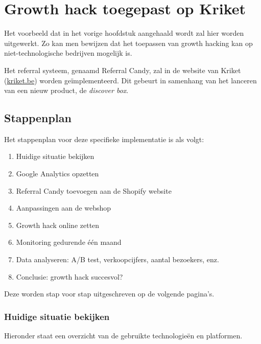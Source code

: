 
\chapter{Growth hack toegepast op Kriket}
\label{ch:implementatie}

Het voorbeeld dat in het vorige hoofdstuk aangehaald wordt zal hier worden uitgewerkt. Zo kan men bewijzen dat het toepassen van growth hacking kan op niet-technologische bedrijven mogelijk is. 

Het referral systeem, genaamd Referral Candy, zal in de website van Kriket (\href{https://kriket.be}{kriket.be}) worden geïmplementeerd. Dit gebeurt in samenhang van het lanceren van een nieuw product, de \emph{discover box}.

\section{Stappenplan}
\label{sec:implementatie-stappenplan}

Het stappenplan voor deze specifieke implementatie is als volgt:

\begin{enumerate}
	\item Huidige situatie bekijken
	\item Google Analytics opzetten
	\item Referral Candy toevoegen aan de Shopify website
	\item Aanpassingen aan de webshop
	\item Growth hack online zetten
	\item Monitoring gedurende één maand
	\item Data analyseren: A/B test, verkoopcijfers, aantal bezoekers, enz.
	\item Conclusie: growth hack succesvol?
\end{enumerate}

Deze worden stap voor stap uitgeschreven op de volgende pagina's. 

\subsection{Huidige situatie bekijken} \label{sec:huidige-situatie-analyseren}

Hieronder staat een overzicht van de gebruikte technologieën en platformen.


